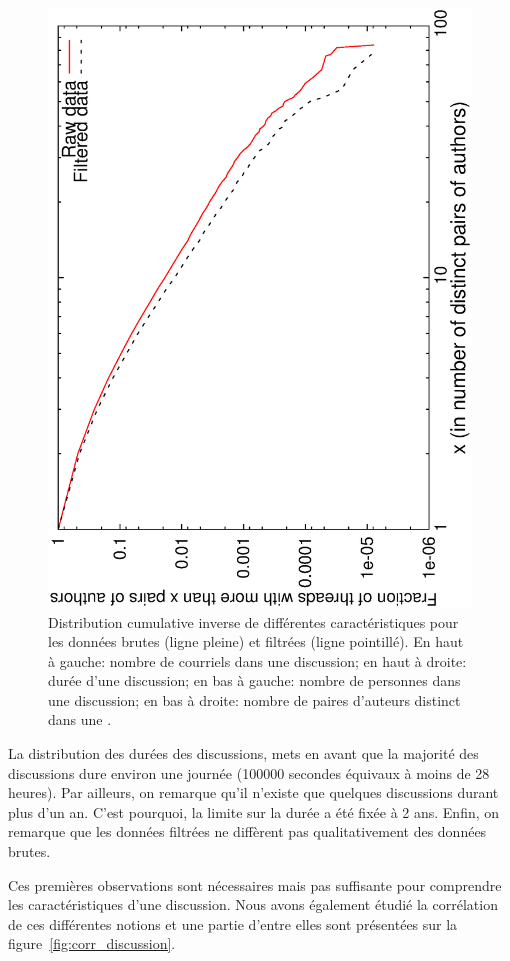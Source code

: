 \begin{figure}
	\includegraphics[angle=-90, width=0.49\linewidth]{img/mailing/authorpairs-ccdf.eps}
	
	\caption{Distribution cumulative inverse de différentes caractéristiques pour les données brutes (ligne pleine) et filtrées (ligne pointillé). En haut à gauche: nombre de courriels dans une discussion; en haut à droite: durée d'une discussion; en bas à gauche: nombre de personnes dans une discussion; en bas à droite: nombre de paires d'auteurs distinct dans une .}
	\label{fig:dists_discussion}
\end{figure}

La distribution des durées des discussions, mets en avant que la majorité des discussions dure environ une journée (100000 secondes équivaux à moins de 28 heures).
Par ailleurs, on remarque qu'il n'existe que quelques discussions durant plus d'un an.
C'est pourquoi, la limite sur la durée a été fixée à 2 ans.
Enfin, on remarque que les données filtrées ne diffèrent pas qualitativement des données brutes.

Ces premières observations sont nécessaires mais pas suffisante pour comprendre les caractéristiques d'une discussion.
Nous avons également étudié la corrélation de ces différentes notions et une partie d'entre elles sont présentées sur la figure~\ref{fig:corr_discussion}.


